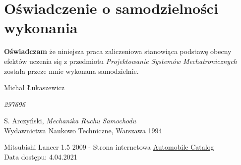 \documentclass[12pt, a4paper, headings=normal]{article}
\begin{document}
\newpage
\section{Oświadczenie o samodzielności wykonania}

\textbf{Oświadczam} że niniejsza praca zaliczeniowa stanowiąca podstawę obecny
efektów uczenia się z przedmiotu \textit{Projektowanie Systemów Mechatronicznych} 
została przeze mnie wykonana samodzielnie.

\bigskip

\hfill Michał Łukaszewicz

\hfill \textit{297696}

\begin{thebibliography}{20} 
		S. Arczyński, \emph{Mechanika Ruchu Samochodu}\\
		Wydawnictwa Naukowo Techniczne, Warszawa 1994

		Mitsubishi Lancer 1.5 2009 - Strona internetowa
		\href{https://www.automobile-catalog.com/car/2009/1996115/mitsubishi_lancer_1_5.html}{Automobile Catalog}\\
		Data dostępu: 4.04.2021
\end{thebibliography}
   
\end{document}
